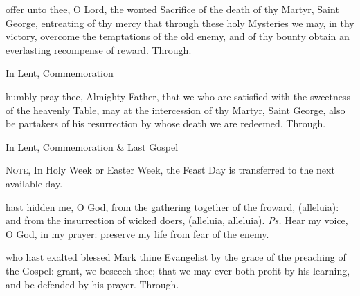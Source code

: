 
\secret
{} offer unto thee, O Lord, the wonted Sacrifice of the death of thy Martyr, Saint George, entreating of thy mercy that through these holy Mysteries we may, in thy victory, overcome the temptations of the old enemy, and of thy bounty obtain an everlasting recompense of reward. Through.
\begin{rubric}
    In Lent, Commemoration %
\end{rubric}


\postcommunion
{} humbly pray thee, Almighty Father, that we who are satisfied with the sweetness of the heavenly Table, may at the intercession of thy Martyr, Saint George, also be partakers of his resurrection by whose death we are redeemed. Through.
\begin{rubric}
    In Lent, Commemoration \& Last Gospel 
\end{rubric}


\clearpage
{}

\begin{rubric}
	\textsc{Note,} In Holy Week or Easter Week, the Feast Day is transferred to the next available day.
\end{rubric}

\introit
{} hast hidden me, O God, from the gathering together of the froward, (alleluia): and from the insurrection of wicked doers, (alleluia, alleluia). \textit{Ps.} Hear my voice, O God, in my prayer: preserve my life from fear of the enemy.

\collect
{} who hast exalted blessed Mark thine Evangelist by the grace of the preaching of the Gospel: grant, we beseech thee; that we may ever both profit by his learning, and be defended by his prayer. Through.

